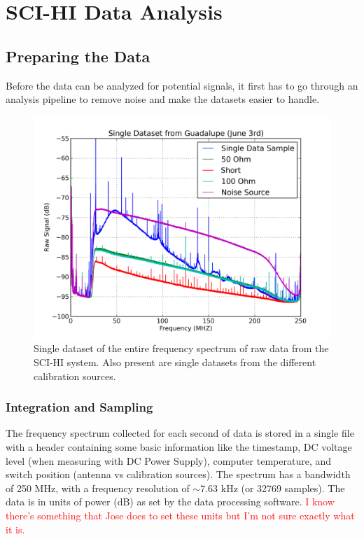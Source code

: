 \chapter{SCI-HI Data Analysis}\label{Ch:Data}

\section{Preparing the Data}
Before the data can be analyzed for potential signals, it first has to go through an analysis pipeline to remove noise and make the datasets easier to handle. 

\begin{figure}[htb]
\begin{center}
\includegraphics[width=0.9\linewidth]{Data_analysis/figures/single_raw_guad_june03.png}
\caption{Single dataset of the entire frequency spectrum of raw data from the SCI-HI system. Also present are single datasets from the different calibration sources.}
\label{Fig:raw_data}
\end{center}
\end{figure}

\subsection{Integration and Sampling}
The frequency spectrum collected for each second of data is stored in a single file with a header containing some basic information like the timestamp, DC voltage level (when measuring with DC Power Supply), computer temperature, and switch position (antenna vs calibration sources). The spectrum has a bandwidth of 250 MHz, with a frequency resolution of $\sim 7.63$ kHz (or 32769 samples). The data is in units of power (dB) as set by the data processing software. \textcolor{red}{I know there's something that Jose does to set these units but I'm not sure exactly what it is.} 

